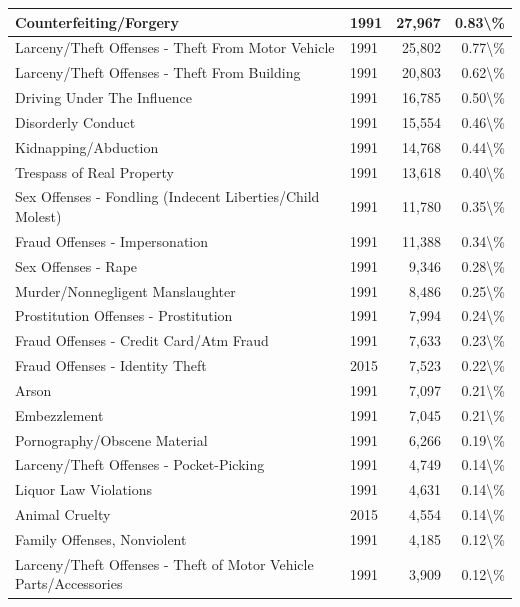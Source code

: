 \documentclass[
]{krantz}
\begin{document}
\begin{longtable}[t]{l|l|r|r}
\hline
Counterfeiting/Forgery & 1991 & 27,967 & 0.83\textbackslash{}\%\\
\hline
Larceny/Theft Offenses - Theft From Motor Vehicle & 1991 & 25,802 & 0.77\textbackslash{}\%\\
\hline
Larceny/Theft Offenses - Theft From Building & 1991 & 20,803 & 0.62\textbackslash{}\%\\
\hline
Driving Under The Influence & 1991 & 16,785 & 0.50\textbackslash{}\%\\
\hline
Disorderly Conduct & 1991 & 15,554 & 0.46\textbackslash{}\%\\
\hline
Kidnapping/Abduction & 1991 & 14,768 & 0.44\textbackslash{}\%\\
\hline
Trespass of Real Property & 1991 & 13,618 & 0.40\textbackslash{}\%\\
\hline
Sex Offenses - Fondling (Indecent Liberties/Child Molest) & 1991 & 11,780 & 0.35\textbackslash{}\%\\
\hline
Fraud Offenses - Impersonation & 1991 & 11,388 & 0.34\textbackslash{}\%\\
\hline
Sex Offenses - Rape & 1991 & 9,346 & 0.28\textbackslash{}\%\\
\hline
Murder/Nonnegligent Manslaughter & 1991 & 8,486 & 0.25\textbackslash{}\%\\
\hline
Prostitution Offenses - Prostitution & 1991 & 7,994 & 0.24\textbackslash{}\%\\
\hline
Fraud Offenses - Credit Card/Atm Fraud & 1991 & 7,633 & 0.23\textbackslash{}\%\\
\hline
Fraud Offenses - Identity Theft & 2015 & 7,523 & 0.22\textbackslash{}\%\\
\hline
Arson & 1991 & 7,097 & 0.21\textbackslash{}\%\\
\hline
Embezzlement & 1991 & 7,045 & 0.21\textbackslash{}\%\\
\hline
Pornography/Obscene Material & 1991 & 6,266 & 0.19\textbackslash{}\%\\
\hline
Larceny/Theft Offenses - Pocket-Picking & 1991 & 4,749 & 0.14\textbackslash{}\%\\
\hline
Liquor Law Violations & 1991 & 4,631 & 0.14\textbackslash{}\%\\
\hline
Animal Cruelty & 2015 & 4,554 & 0.14\textbackslash{}\%\\
\hline
Family Offenses, Nonviolent & 1991 & 4,185 & 0.12\textbackslash{}\%\\
\hline
Larceny/Theft Offenses - Theft of Motor Vehicle Parts/Accessories & 1991 & 3,909 & 0.12\textbackslash{}\%\\

\end{longtable}
\end{document}
